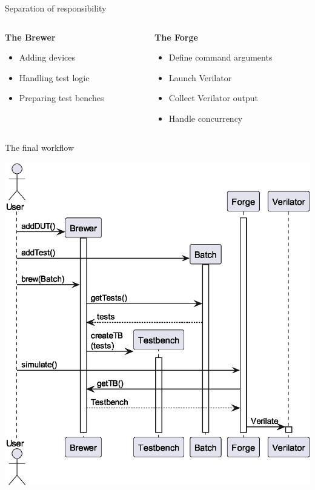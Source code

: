 \documentclass[aspectratio=169, handout]{beamer}
\begin{document}
\begin{frame}{Separation of responsibility}
    \begin{columns}[T]
        \begin{column}{.45\textwidth}
            \textbf{The Brewer}
            \begin{itemize}
                \item Adding devices
                \item Handling test logic
                \item Preparing test benches
            \end{itemize}
        \end{column}
        \begin{column}{.45\textwidth}
            \textbf{The Forge}
            \begin{itemize}
                \item Define command arguments
                \item Launch Verilator
                \item Collect Verilator output
                \item Handle concurrency
            \end{itemize}
        \end{column}
    \end{columns}
\end{frame}
\begin{frame}{The final workflow}
    \begin{center}
        \includegraphics[height=.8\textheight]{out/plantuml/seq/sequenceDiag.eps}
    \end{center}
\end{frame}
\end{document}

